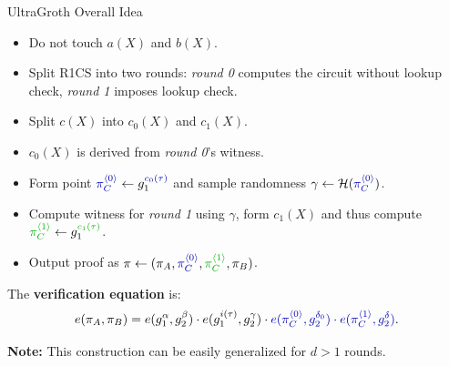 \documentclass{zkdl-presentation-template}
\begin{document}
\begin{frame}{UltraGroth Overall Idea}
    \begin{itemize}
        \item Do not touch $a(X)$ and $b(X)$.
        \item Split R1CS into two rounds:
        \textcolor{blue!70!black}{\textit{round 0}} computes the circuit without
        lookup check, \textcolor{green!70!black}{\textit{round 1}} imposes
        lookup check.
        \item Split $c(X)$ into \textcolor{blue!70!black}{$c_0(X)$} and
        \textcolor{green!70!black}{$c_1(X)$}. 
        \item $c_0(X)$ is derived from \textcolor{blue!70!black}{\textit{round
        0}}'s witness. 
        \item Form point $\textcolor{blue!70!black}{\pi_C^{\langle 0 \rangle}}
        \gets
        g_1^{\textcolor{blue!70!black}{\textcolor{blue!70!black}{c_0(\tau)}}}$
        and sample randomness $\gamma \gets
        \mathcal{H}(\textcolor{blue!70!black}{\pi_C^{\langle 0 \rangle}})$.
        \item Compute witness for \textcolor{green!70!black}{\textit{round 1}} using $\gamma$,
        form \textcolor{green!70!black}{$c_1(X)$} and thus compute
        $\textcolor{green!70!black}{\pi_C^{\langle 1 \rangle}} \gets
        g_1^{\textcolor{green!70!black}{c_1(\tau)}}$.
        \item Output proof as $\pi \gets (\pi_A, \textcolor{blue!70!black}{\pi_C^{\langle
        0 \rangle}}, \textcolor{green!70!black}{\pi_C^{\langle 1 \rangle}}, \pi_B)$.
    \end{itemize}

    The \textbf{verification equation} is:
    \begin{equation*}
        e(\pi_A,\pi_B) = e(g_1^{\alpha},g_2^{\beta})\cdot e(g_1^{i(\tau)},g_2^{\gamma})\cdot \textcolor{blue!70!black}{e(\pi_C^{\langle 0 \rangle},g_2^{\delta_0}) \cdot e(\pi_C^{\langle 1 \rangle},g_2^{\delta})}.
    \end{equation*}

    \textbf{Note:} This construction can be easily generalized for $d>1$ rounds.
\end{frame}
\end{document}
